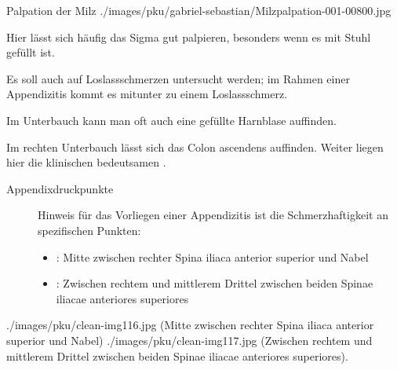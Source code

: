 \begin{PictureSeries}{}{Palpation der Milz}
{./images/pku/gabriel-sebastian/Milzpalpation-001-00800.jpg}
{}
{}
{}
{}
{}
{}
{}
\end{PictureSeries}

{Hier lässt sich häufig das Sigma gut palpieren, besonders
wenn es mit Stuhl gefüllt ist.

Es soll auch auf Loslassschmerzen untersucht werden; im
Rahmen einer Appendizitis kommt es mitunter zu einem
 Loslassschmerz.

Im Unterbauch kann man oft auch eine gefüllte Harnblase
auffinden.

}
{
\begin{PkuBefunde}[]
  \item[\SymbolPkuNormal] 
\end{PkuBefunde}
}
{}
{}
{}

{Im rechten Unterbauch lässt sich das Colon ascendens
auffinden. Weiter liegen hier die klinischen bedeutsamen
.

\begin{description}
  \item[Appendixdruckpunkte]
  Hinweis für das
  Vorliegen einer Appendizitis ist die Schmerzhaftigkeit an spezifischen
  Punkten:
  \begin{itemize}
    \item {}:
    Mitte zwischen rechter Spina iliaca anterior superior und Nabel
    \item {}:
    Zwischen rechtem und mittlerem Drittel zwischen beiden
    Spinae iliacae anteriores superiores
  \end{itemize}
\end{description}

}
{}
{}
{}
{}

\begin{PictureSeries}{}{}
{./images/pku/clean-img116.jpg}
{
(Mitte zwischen rechter Spina iliaca anterior superior und Nabel)}
{./images/pku/clean-img117.jpg}
{
(Zwischen rechtem und mittlerem Drittel zwischen beiden
Spinae iliacae anteriores superiores).}
{}
{}
{}
{}
\end{PictureSeries}

